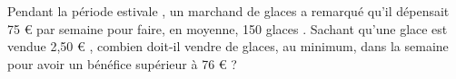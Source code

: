 
Pendant la période estivale , un marchand de glaces a remarqué qu'il dépensait 75 € par semaine pour faire, en moyenne, 150 glaces .
Sachant qu'une glace est vendue 2,50 € , combien doit-il vendre de glaces, au minimum, dans la semaine pour avoir un bénéfice supérieur à 76 € ? 